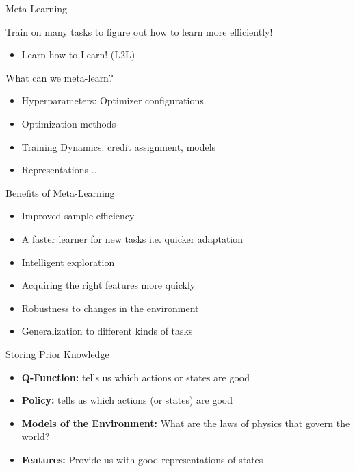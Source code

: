 \documentclass[aspectratio=169]{../latex_main/tntbeamer}  %
\begin{document}
\begin{frame}{Meta-Learning}

Train on many tasks to figure out how to learn more efficiently!
\begin{itemize}
    \item Learn how to Learn! (L2L)
\end{itemize}

\vfill
\pause
What can we meta-learn?
\begin{itemize}
    \item Hyperparameters: Optimizer configurations
    \item Optimization methods
    \item Training Dynamics: credit assignment, models
    \item Representations ...
\end{itemize}

\end{frame}

\begin{frame}{Benefits of Meta-Learning}

\begin{itemize}
    \item Improved sample efficiency
    \item A faster learner for new tasks i.e. quicker adaptation
    \item Intelligent exploration 
    \item Acquiring the right features more quickly
    \item Robustness to changes in the environment
    \item Generalization to different kinds of tasks
\end{itemize}    
\end{frame}

\begin{frame}{Storing Prior Knowledge}

\begin{itemize}
    \item \textbf{Q-Function:} tells us which actions or states are good
    \item \textbf{Policy:} tells us which actions (or states) are good
    \item \textbf{Models of the Environment:} What are the laws of physics that govern the world?
    \item \textbf{Features:} Provide us with good representations of states


\end{itemize}
\vfill

\end{frame}
\end{document}
